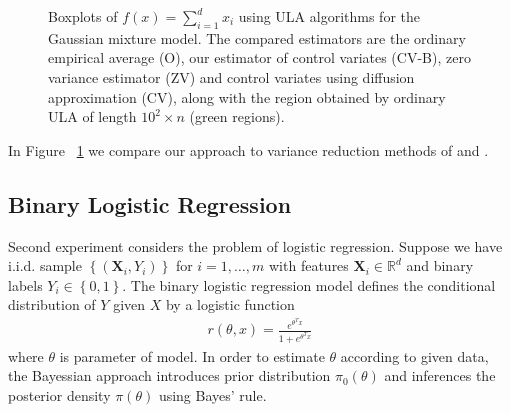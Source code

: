 \documentclass[preprint]{imsart}
\begin{document}
 \begin{figure}[tbh]
\centering
{}
\qquad
{}
\caption{Boxplots of $f(x) = \sum_{i=1}^d x_i$ using ULA algorithms for the Gaussian mixture model. The compared estimators are the ordinary empirical average  (O), our estimator of control variates (CV-B), zero variance estimator (ZV) and control variates using diffusion approximation (CV), along with the region obtained by ordinary ULA of length $10^2 \times n$ (green regions). \label{fig:1}}
\end{figure}
 
 
In Figure ~\ref{fig:1} we compare our approach to variance reduction methods of \cite{mira2013zero} and \cite{brosse2018diffusion}.

\subsection{Binary Logistic Regression}

Second experiment considers the problem of logistic regression. Suppose we have i.i.d. sample $\left\{ (\mathbf{X}_i, Y_i)\right\}$ for $ i =1, \dots , m$ with features $\mathbf{X}_i \in \mathbb{R}^d $ and binary labels $Y_i \in \left\{0,1 \right\}$. The binary logistic regression model defines the conditional distribution of $Y$ given $X$ by a logistic function 
\begin{eqnarray*}
r(\theta, x) = \frac{e^{\theta^T x}}{1 + e^{\theta^T x}}
\end{eqnarray*}
where $\theta$ is parameter of model. In order to estimate $\theta$ according to given data, the Bayessian approach introduces prior distribution $\pi_0(\theta)$ and inferences the posterior density $\pi(\theta)$ using Bayes' rule. 
\end{document}
